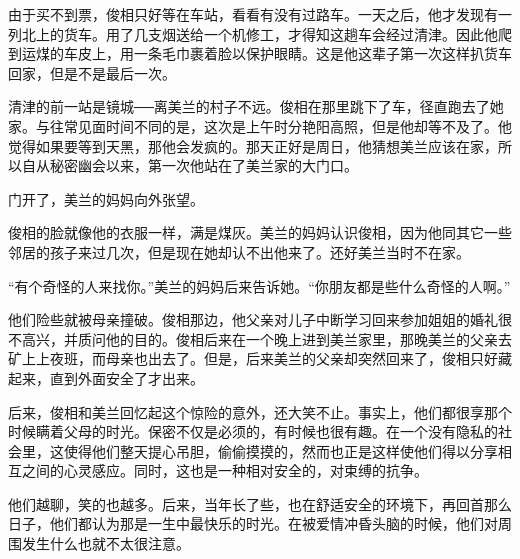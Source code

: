 由于买不到票，俊相只好等在车站，看看有没有过路车。一天之后，他才发现有一列北上的货车。用了几支烟送给一个机修工，才得知这趟车会经过清津。因此他爬到运煤的车皮上，用一条毛巾裹着脸以保护眼睛。这是他这辈子第一次这样扒货车回家，但是不是最后一次。

清津的前一站是镜城──离美兰的村子不远。俊相在那里跳下了车，径直跑去了她家。与往常见面时间不同的是，这次是上午时分艳阳高照，但是他却等不及了。他觉得如果要等到天黑，那他会发疯的。那天正好是周日，他猜想美兰应该在家，所以自从秘密幽会以来，第一次他站在了美兰家的大门口。

门开了，美兰的妈妈向外张望。

俊相的脸就像他的衣服一样，满是煤灰。美兰的妈妈认识俊相，因为他同其它一些邻居的孩子来过几次，但是现在她却认不出他来了。还好美兰当时不在家。

“有个奇怪的人来找你。”美兰的妈妈后来告诉她。“你朋友都是些什么奇怪的人啊。”

他们险些就被母亲撞破。俊相那边，他父亲对儿子中断学习回来参加姐姐的婚礼很不高兴，并质问他的目的。俊相后来在一个晚上进到美兰家里，那晚美兰的父亲去矿上上夜班，而母亲也出去了。但是，后来美兰的父亲却突然回来了，俊相只好藏起来，直到外面安全了才出来。

后来，俊相和美兰回忆起这个惊险的意外，还大笑不止。事实上，他们都很享那个时候瞒着父母的时光。保密不仅是必须的，有时候也很有趣。在一个没有隐私的社会里，这使得他们整天提心吊胆，偷偷摸摸的，然而也正是这样使他们得以分享相互之间的心灵感应。同时，这也是一种相对安全的，对束缚的抗争。

他们越聊，笑的也越多。后来，当年长了些，也在舒适安全的环境下，再回首那么日子，他们都认为那是一生中最快乐的时光。在被爱情冲昏头脑的时候，他们对周围发生什么也就不太很注意。
